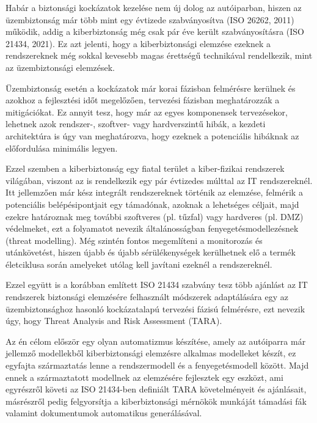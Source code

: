 
Habár a biztonsági kockázatok kezelése nem új dolog az autóiparban, hiszen az üzembiztonság már több mint egy évtizede szabványosítva (ISO 26262, 2011) működik, addig a kiberbiztonság még csak pár éve került szabványosításra (ISO 21434, 2021). Ez azt jelenti, hogy a kiberbiztonsági elemzése ezeknek a rendszereknek még sokkal kevesebb magas érettségű technikával rendelkezik, mint az üzembiztonsági elemzések.

Üzembiztonság esetén a kockázatok már korai fázisban felmérésre kerülnek és azokhoz a fejlesztési időt megelőzően, tervezési fázisban meghatározzák a mitigációkat. Ez annyit tesz, hogy már az egyes komponensek tervezésekor, lehetnek azok rendszer-, szoftver- vagy hardverszintű hibák, a kezdeti architektúra is úgy van meghatározva, hogy ezeknek a potenciális hibáknak az előfordulása minimális legyen.

Ezzel szemben a kiberbiztonság egy fiatal terület a kiber-fizikai rendszerek világában, viszont az is rendelkezik egy pár évtizedes múlttal az IT rendszereknél. Itt jellemzően már kész integrált rendszereknek történik az elemzése, felmérik a potenciális belépésipontjait egy támadónak, azoknak a lehetséges céljait, majd ezekre határoznak meg további szoftveres (pl. tűzfal) vagy hardveres (pl. DMZ) védelmeket, ezt a folyamatot nevezik általánosságban fenyegetésmodellezésnek (threat modelling). Még szintén fontos megemlíteni a monitorozás és utánkövetést, hiszen újabb és újabb sérülékenységek kerülhetnek elő a termék életciklusa során amelyeket utólag kell javítani ezeknél a rendszereknél.

Ezzel együtt is a korábban említett ISO 21434 szabvány tesz több ajánlást az IT rendszerek biztonsági elemzésére felhasznált módszerek adaptálására egy az üzembiztonsághoz hasonló kockázatalapú tervezési fázisú felmérésre, ezt nevezik úgy, hogy Threat Analysis and Risk Assessment (TARA).

Az én célom először egy olyan automatizmus készítése, amely az autóiparra már jellemző modellekből kiberbiztonsági elemzésre alkalmas modelleket készít, ez egyfajta származtatás lenne a rendszermodell és a fenyegetésmodell között. Majd ennek a származtatott modellnek az elemzésére fejlesztek egy eszközt, ami egyrészről követi az ISO 21434-ben definiált TARA követelményeit és ajánlásait, másrészről pedig felgyorsítja a kiberbiztonsági mérnökök munkáját támadási fák valamint dokumentumok automatikus generálásával.\\

